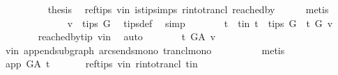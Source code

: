 \begin{isabellebody}
\ \ \isamarkupfalse%
\ {}\isanewline
\ \ \isamarkupfalse%
\ \isamarkupfalse%
\ {\isacharquery}{\kern0pt}thesis\ \isamarkupfalse%
\ ref{\isacharunderscore}{\kern0pt}tips\ v{\isacharunderscore}{\kern0pt}in\ is{\isacharunderscore}{\kern0pt}tip{\isachardot}{\kern0pt}simps\ r{\isacharunderscore}{\kern0pt}into{\isacharunderscore}{\kern0pt}trancl{\isacharprime}{\kern0pt}\ reached{\isacharunderscore}{\kern0pt}by\isanewline
\ \ \ \ \isamarkupfalse%
\ {\isacharparenleft}{\kern0pt}metis{\isacharparenright}{\kern0pt}\ \isanewline
\ \ \isamarkupfalse%
\isanewline
\ \ \ \ \isamarkupfalse%
\ {}\isanewline
\ \ \ \ \isamarkupfalse%
\ \isamarkupfalse%
\ {\isachardoublequoteopen}v\ {\isasymnotin}\ tips\ G{\isachardoublequoteclose}\ \isamarkupfalse%
\ tips{\isacharunderscore}{\kern0pt}def\ \isamarkupfalse%
\ simp\isanewline
\ \ \ \ \isamarkupfalse%
\ \isamarkupfalse%
\ t\ \ t{\isacharunderscore}{\kern0pt}in{\isacharcolon}{\kern0pt}\ {\isachardoublequoteopen}t\ {\isasymin}\ tips\ G\ {\isasymand}\ t\ {\isasymrightarrow}\isactrlsup {\isacharplus}{\kern0pt}\isactrlbsub G\isactrlesub \ v{\isachardoublequoteclose}\ \isanewline
\ \ \ \ \ \ \isamarkupfalse%
\ reached{\isacharunderscore}{\kern0pt}by{\isacharunderscore}{\kern0pt}tip\ v{\isacharunderscore}{\kern0pt}in\ \isamarkupfalse%
\ auto\isanewline
\ \ \ \ \isamarkupfalse%
\ \isamarkupfalse%
\ {\isachardoublequoteopen}t\ {\isasymrightarrow}\isactrlsup {\isacharplus}{\kern0pt}\isactrlbsub G{\isacharunderscore}{\kern0pt}A\isactrlesub \ v{\isachardoublequoteclose}\ \isamarkupfalse%
\ v{\isacharunderscore}{\kern0pt}in\ append{\isacharunderscore}{\kern0pt}subgraph\ arcs{\isacharunderscore}{\kern0pt}ends{\isacharunderscore}{\kern0pt}mono\ trancl{\isacharunderscore}{\kern0pt}mono\isanewline
\ \ \ \ \ \ \ \ \isamarkupfalse%
\ {\isacharparenleft}{\kern0pt}metis{\isacharparenright}{\kern0pt}\isanewline
\ \ \ \ \isamarkupfalse%
\ \isamarkupfalse%
\ {\isachardoublequoteopen}app\ {\isasymrightarrow}\isactrlsup {\isacharplus}{\kern0pt}\isactrlbsub G{\isacharunderscore}{\kern0pt}A\isactrlesub \ t{\isachardoublequoteclose}\ \isanewline
\ \ \ \ \isamarkupfalse%
\ ref{\isacharunderscore}{\kern0pt}tips\ v{\isacharunderscore}{\kern0pt}in\ r{\isacharunderscore}{\kern0pt}into{\isacharunderscore}{\kern0pt}trancl{\isacharprime}{\kern0pt}\ t{\isacharunderscore}{\kern0pt}in\isanewline

\end{isabellebody}

